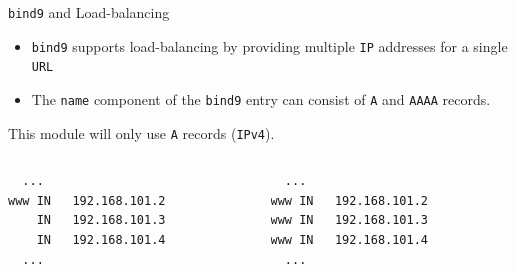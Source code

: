 \documentclass[xcolor=table]{beamer}
\begin{document}
\begin{frame}[fragile]{\texttt{bind9} and Load-balancing}
  \begin{itemize}
    \item \texttt{bind9} supports load-balancing by providing multiple \texttt{IP} addresses for a single \texttt{URL}
    \item The \texttt{name} component of the \texttt{bind9} entry can consist of \texttt{A} and \texttt{AAAA} records.
  \end{itemize}
  \begin{tcolorbox}
    \begin{center}
      \scriptsize This module will only use \texttt{A} records (\texttt{IPv4}).
    \end{center}
  \end{tcolorbox}
  \begin{columns}
    \begin{column}{0.5\textwidth}
      \begin{tcolorbox}
        \lstset{
          basicstyle=\scriptsize\ttfamily,
        }
    \begin{lstlisting}
  ...
www IN   192.168.101.2
    IN	 192.168.101.3
    IN	 192.168.101.4
  ...
    \end{lstlisting}
      \end{tcolorbox}
    \end{column}
    \begin{column}{0.5\textwidth}
      \begin{tcolorbox}
        \lstset{
          basicstyle=\scriptsize\ttfamily,
        }
    \begin{lstlisting}
  ...
www IN   192.168.101.2
www IN   192.168.101.3
www IN   192.168.101.4
  ...
    \end{lstlisting}
      \end{tcolorbox}
    \end{column}
  \end{columns}
\end{frame}
\end{document}
